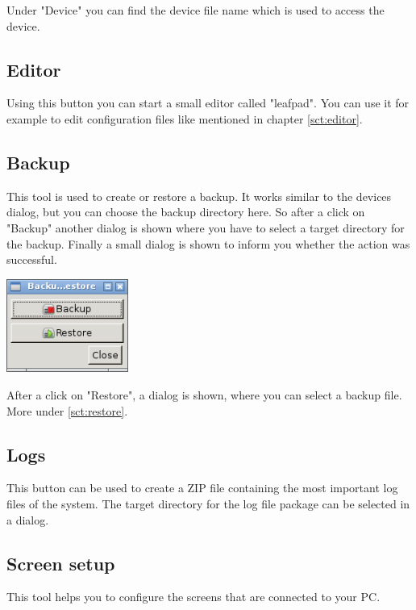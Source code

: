 \documentclass[a4paper,12pt,twoside]{article}
\begin{document}
Under "Device" you can find the device file
name which is used to access the device.


\subsection{Editor}
\label{sct:gui_editor}
Using this button you can start a
small editor called "leafpad". You can use
it for example to edit configuration files like mentioned in chapter
\ref{sct:editor}.


\subsection{Backup}
\label{sct:dialog_backup}
This tool is used to create or restore
a backup. It works similar to the devices dialog, but you can choose
the backup directory here. So after a click on
"Backup" another dialog is shown where you
have to select a target directory for the backup. Finally a small
dialog is shown to inform you whether the action was successful.

\bigskip
\begin{minipage}{\linewidth}
    \centering
    \includegraphics[width=4cm]{efaLiveen-img/efaLiveen-img22.png}
    \label{fig:dialog_backp}
\end{minipage}
\bigskip

After a click on "Restore", a dialog is shown, where you can select a backup file.
More under \ref{sct:restore}.


\subsection{Logs}
\label{sct:logfiles}
This button can be used to create a ZIP file containing the most important log
files of the system. The target directory for the log file package can be selected
in a dialog.


\subsection{Screen setup}
\label{sct:screen_setup}
This tool helps you to configure the screens that are connected to your
PC.
\end{document}

